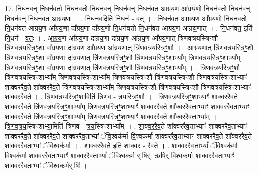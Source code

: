 \documentclass[17pt]{extarticle}
\begin{document}
17. नि॒धन॑वन् नि॒धन॑वतो नि॒धन॑वतो नि॒धन॑वन् नि॒धन॑वन् नि॒धन॑वत आग्रय॒ण आ᳚ग्रय॒णो नि॒धन॑वतो नि॒धन॑वन् नि॒धन॑वन् नि॒धन॑वत आग्रय॒णः । . नि॒धन॑व॒दिति॑ नि॒धन॑ - व॒त् । . नि॒धन॑वत आग्रय॒ण आ᳚ग्रय॒णो नि॒धन॑वतो नि॒धन॑वत आग्रय॒ण आ᳚ग्रय॒णा दा᳚ग्रय॒णा दा᳚ग्रय॒णो नि॒धन॑वतो नि॒धन॑वत आग्रय॒ण आ᳚ग्रय॒णात् । . नि॒धन॑वत॒ इति॑ नि॒धन॑ - व॒तः॒ । . आ॒ग्र॒य॒ण आ᳚ग्रय॒णा दा᳚ग्रय॒णा दा᳚ग्रय॒ण आ᳚ग्रय॒ण आ᳚ग्रय॒णात् त्रि॑णवत्रयस्त्रिꣳ॒॒शौ त्रि॑णवत्रयस्त्रिꣳ॒॒शा वा᳚ग्रय॒णा दा᳚ग्रय॒ण आ᳚ग्रय॒ण आ᳚ग्रय॒णात् त्रि॑णवत्रयस्त्रिꣳ॒॒शौ । . आ॒ग्र॒य॒णात् त्रि॑णवत्रयस्त्रिꣳ॒॒शौ त्रि॑णवत्रयस्त्रिꣳ॒॒शा वा᳚ग्रय॒णा दा᳚ग्रय॒णात् त्रि॑णवत्रयस्त्रिꣳ॒॒शौ त्रि॑णवत्रयस्त्रिꣳ॒॒शाभ्या᳚म् त्रिणवत्रयस्त्रिꣳ॒॒शाभ्या᳚म् त्रिणवत्रयस्त्रिꣳ॒॒शा वा᳚ग्रय॒णा दा᳚ग्रय॒णात् त्रि॑णवत्रयस्त्रिꣳ॒॒शौ त्रि॑णवत्रयस्त्रिꣳ॒॒शाभ्या᳚म् । . त्रि॒ण॒व॒त्र॒य॒स्त्रिꣳ॒॒शौ त्रि॑णवत्रयस्त्रिꣳ॒॒शाभ्या᳚म् त्रिणवत्रयस्त्रिꣳ॒॒शाभ्या᳚म् त्रिणवत्रयस्त्रिꣳ॒॒शौ त्रि॑णवत्रयस्त्रिꣳ॒॒शौ त्रि॑णवत्रयस्त्रिꣳ॒॒शाभ्याꣳ॑ शाक्वररैव॒ते शा᳚क्वररैव॒ते त्रि॑णवत्रयस्त्रिꣳ॒॒शाभ्या᳚म् त्रिणवत्रयस्त्रिꣳ॒॒शौ त्रि॑णवत्रयस्त्रिꣳ॒॒शौ त्रि॑णवत्रयस्त्रिꣳ॒॒शाभ्याꣳ॑ शाक्वररैव॒ते । . त्रि॒ण॒व॒त्र॒य॒स्त्रिꣳ॒॒शाविति॑ त्रिणव - त्र॒य॒स्त्रिꣳ॒॒शौ । . त्रि॒ण॒व॒त्र॒य॒स्त्रिꣳ॒॒शाभ्याꣳ॑ शाक्वररैव॒ते शा᳚क्वररैव॒ते त्रि॑णवत्रयस्त्रिꣳ॒॒शाभ्या᳚म् त्रिणवत्रयस्त्रिꣳ॒॒शाभ्याꣳ॑ शाक्वररैव॒ते शा᳚क्वररैव॒ताभ्याꣳ॑ शाक्वररैव॒ताभ्याꣳ॑ शाक्वररैव॒ते त्रि॑णवत्रयस्त्रिꣳ॒॒शाभ्या᳚म् त्रिणवत्रयस्त्रिꣳ॒॒शाभ्याꣳ॑ शाक्वररैव॒ते शा᳚क्वररैव॒ताभ्या᳚म् । . त्रि॒ण॒व॒त्र॒य॒स्त्रिꣳ॒॒शाभ्या॒मिति॑ त्रिणव - त्र॒य॒स्त्रिꣳ॒॒शाभ्या᳚म् । . शा॒क्व॒र॒रै॒व॒ते शा᳚क्वररैव॒ताभ्याꣳ॑ शाक्वररैव॒ताभ्याꣳ॑ शाक्वररैव॒ते शा᳚क्वररैव॒ते शा᳚क्वररैव॒ताभ्यां᳚ ॅवि॒श्वक॑र्मा वि॒श्वक॑र्मा शाक्वररैव॒ताभ्याꣳ॑ शाक्वररैव॒ते शा᳚क्वररैव॒ते शा᳚क्वररैव॒ताभ्यां᳚ ॅवि॒श्वक॑र्मा । . शा॒क्व॒र॒रै॒व॒ते इति॑ शाक्वर - रै॒व॒ते । . शा॒क्व॒र॒रै॒व॒ताभ्यां᳚ ॅवि॒श्वक॑र्मा वि॒श्वक॑र्मा शाक्वररैव॒ताभ्याꣳ॑ शाक्वररैव॒ताभ्यां᳚ ॅवि॒श्वक॒र्म र्.षि॒र्॒. ऋषि॑र् वि॒श्वक॑र्मा शाक्वररैव॒ताभ्याꣳ॑ शाक्वररैव॒ताभ्यां᳚ ॅवि॒श्वक॒र्मर्.षिः॑ । \newline
\end{document}
